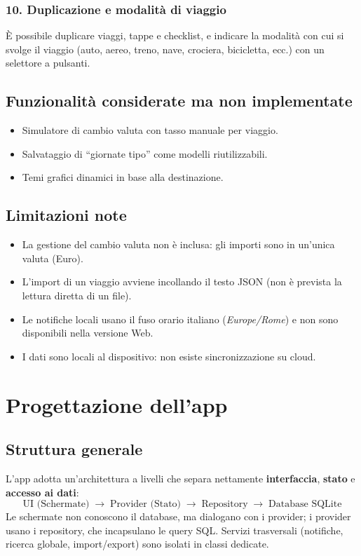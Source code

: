 \documentclass[11pt, a4paper]{article}
\begin{document}
\subsubsection*{10. Duplicazione e modalità di viaggio}
È possibile duplicare viaggi, tappe e checklist, e indicare la modalità con cui
si svolge il viaggio (auto, aereo, treno, nave, crociera, bicicletta, ecc.) con un
selettore a pulsanti.

\subsection{Funzionalità considerate ma non implementate}
\begin{itemize}[noitemsep]
    \item Simulatore di cambio valuta con tasso manuale per viaggio.
    \item Salvataggio di ``giornate tipo'' come modelli riutilizzabili.
    \item Temi grafici dinamici in base alla destinazione.
\end{itemize}

\subsection{Limitazioni note}
\begin{itemize}[noitemsep]
    \item La gestione del cambio valuta non è inclusa: gli importi sono in
    un'unica valuta (Euro).
    \item L'import di un viaggio avviene incollando il testo JSON (non è prevista
    la lettura diretta di un file).
    \item Le notifiche locali usano il fuso orario italiano (\textit{Europe/Rome})
    e non sono disponibili nella versione Web.
    \item I dati sono locali al dispositivo: non esiste sincronizzazione su cloud.
\end{itemize}

\section{Progettazione dell'app}

\subsection{Struttura generale}
L'app adotta un'architettura a livelli che separa nettamente
\textbf{interfaccia}, \textbf{stato} e \textbf{accesso ai dati}:
\[
\text{UI (Schermate)} \;\rightarrow\; \text{Provider (Stato)} \;\rightarrow\;
\text{Repository} \;\rightarrow\; \text{Database SQLite}
\]
Le schermate non conoscono il database, ma dialogano con i provider; i provider
usano i repository, che incapsulano le query SQL. Servizi trasversali
(notifiche, ricerca globale, import/export) sono isolati in classi dedicate.
\end{document}
